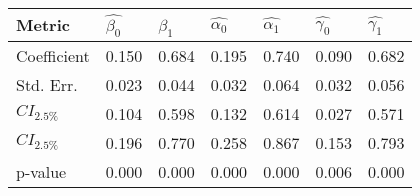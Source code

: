 \begin{tabular}{lllllll}
\toprule
Metric & $\hat{\beta_{0}}$ & $\hat{\beta_{1}}$ & $\hat{\alpha_{0}}$ & $\hat{\alpha_{1}}$ & $\hat{\gamma_{0}}$ & $\hat{\gamma_{1}}$ \\
\midrule
Coefficient & 0.150 & 0.684 & 0.195 & 0.740 & 0.090 & 0.682 \\
Std. Err. & 0.023 & 0.044 & 0.032 & 0.064 & 0.032 & 0.056 \\
$CI_{2.5\%}$ & 0.104 & 0.598 & 0.132 & 0.614 & 0.027 & 0.571 \\
$CI_{2.5\%}$ & 0.196 & 0.770 & 0.258 & 0.867 & 0.153 & 0.793 \\
p-value & 0.000 & 0.000 & 0.000 & 0.000 & 0.006 & 0.000 \\
\bottomrule
\end{tabular}
